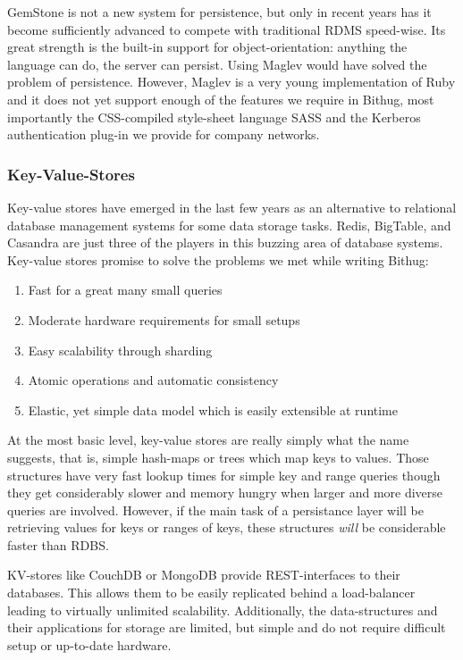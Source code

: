 GemStone is not a new system\cite{butterworth1991gemstone} for persistence, but only
in recent years has it become sufficiently advanced to compete with traditional
RDMS speed-wise. Its great strength is the built-in support for 
object-orientation: anything the language can do, the server can persist. Using
Maglev would have solved the problem of persistence. However, Maglev is a very 
young implementation of Ruby and it does not yet support enough of the features
we require in Bithug, most importantly the CSS-compiled style-sheet language 
SASS and the Kerberos authentication plug-in we provide for company networks.
\subsubsection{Key-Value-Stores}
Key-value stores have emerged in the last few years as an alternative to 
relational database management systems for some data storage tasks. 
Redis, BigTable, and Casandra are just three of the players in this buzzing
area of database systems. Key-value stores promise to solve the problems we 
met while writing Bithug:
\begin{enumerate}
  \item Fast for a great many small queries
  \item Moderate hardware requirements for small setups
  \item Easy scalability through sharding
  \item Atomic operations and automatic consistency
  \item Elastic, yet simple data model which is easily extensible at runtime
\end{enumerate}

At the most basic level, key-value stores are really simply what the name 
suggests, that is, simple hash-maps or trees which map keys to values. Those 
structures have very fast lookup times for simple key and range queries though 
they get considerably slower and memory hungry when larger and more diverse 
queries are involved. However, if the main task of a persistance layer will be
retrieving values for keys or ranges of keys, these structures \emph{will} 
be\cite{chang2006bigtable} considerable faster than RDBS.

KV-stores like CouchDB or MongoDB provide REST-interfaces to their 
databases. This allows them to be easily replicated behind a load-balancer 
leading to virtually unlimited scalability. Additionally, the data-structures 
and their applications for storage are limited, but simple 
and do not require difficult setup or up-to-date hardware. 

